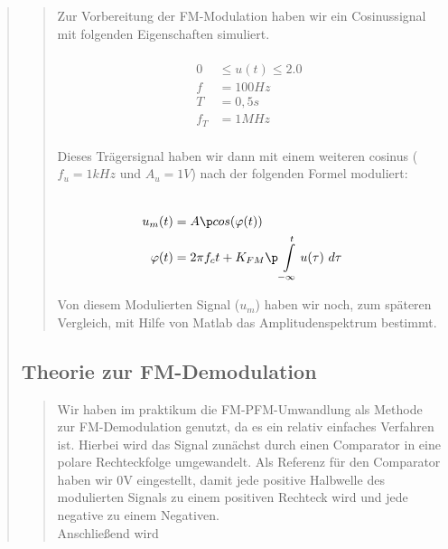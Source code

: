 \begin{quote}
\begin{quote}
        
        Zur Vorbereitung der FM-Modulation haben wir ein Cosinussignal mit folgenden Eigenschaften simuliert.
        
        \begin{equation*}
        \begin{split}
        \\
                 0 &\leq u(t) \leq 2.0
        \\
                 f &= \si{100}{Hz}
        \\
                 T &= \si{0,5}{s}
        \\
               f_T &= \si{1}{MHz}
        \\
        \end{split}
        \end{equation*}
        
        
        Dieses Trägersignal haben wir dann mit einem weiteren cosinus ($f_u = 1kHz$ und $A_u = 1V$) nach der folgenden Formel
        moduliert:
        
        \begin{equation*}
        \begin{split}
        \\
                u_m(t) &= A \p cos(\varphi(t))
        \\
            \varphi(t) &= 2 \pi f_c t + K_{FM} \p \int\limits_{-\infty}^t u(\tau) \ d\tau  
        \\
        \end{split}
        \end{equation*}
        
        Von diesem Modulierten Signal ($u_m$) haben wir noch, zum späteren Vergleich, mit Hilfe von Matlab das Amplitudenspektrum
        bestimmt.
        
        
    \end{quote}
    
    
    \subsection{Theorie zur FM-Demodulation}
    \begin{quote}
        Wir haben im praktikum die FM-PFM-Umwandlung als Methode zur FM-Demodulation genutzt, da es ein relativ einfaches
        Verfahren ist. Hierbei wird das Signal zunächst durch einen Comparator in eine polare Rechteckfolge umgewandelt. Als
        Referenz für den Comparator haben wir \si{0}{V} eingestellt, damit jede positive Halbwelle des modulierten Signals zu
        einem positiven Rechteck wird und jede negative zu einem Negativen.\\
        Anschließend wird
        

\end{quote}
\end{quote}
